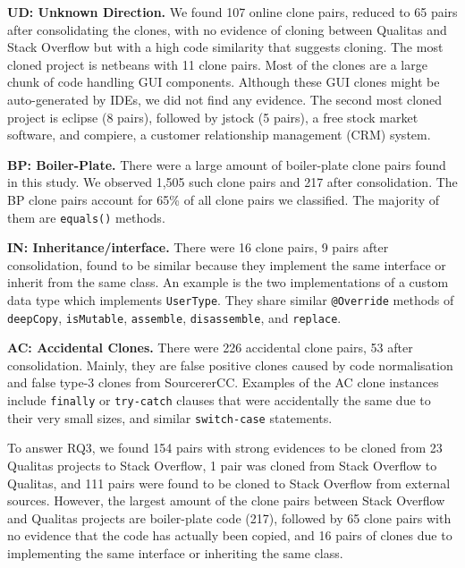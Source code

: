 \documentclass[10pt,journal,compsoc]{IEEEtran}
\newenvironment{boxquote}{\vspace{-1ex}\setlength{\FrameSep}{1\fboxsep}\begin{framed}\setlength{\parskip}{0.5\baselineskip}\setlength{\parindent}{0pt}}{\end{framed}}
\begin{document}

\textbf{UD: Unknown Direction.} We found 107 online clone pairs, reduced to 65
pairs after consolidating the clones, with no evidence of cloning between Qualitas
and Stack Overflow but with a high code similarity that suggests cloning. 
The most cloned project is \textsf{netbeans} with 11 clone pairs. Most of the
clones are a large chunk of code handling GUI components. Although these GUI
clones might be auto-generated by IDEs, we did not find any evidence. The second
most cloned project is \textsf{eclipse} (8 pairs), followed by
\textsf{jstock}  (5 pairs),
a free stock market software, and \textsf{compiere}, a customer
relationship management (CRM) system.

\textbf{BP: Boiler-Plate.} There were a large amount of boiler-plate clone pairs
found in this study. We observed 1,505 such clone pairs and 217 after
consolidation. The BP clone pairs account for 65\% of all clone pairs we
classified. The majority of them are {\small{\texttt{equals()}}} methods.

\textbf{IN: Inheritance/interface.} There were 16 clone pairs, 9 pairs after
consolidation, found to be similar because they implement the same interface or
inherit from the same class. An example is the two implementations of a
custom data type which implements {\small\texttt{UserType}}. They share similar
{\small\texttt{@Override}} methods of {\small\texttt{deepCopy}},
{\small\texttt{isMutable}}, {\small\texttt{assemble}},
{\small\texttt{disassemble}}, and {\small\texttt{replace}}.

\textbf{AC: Accidental Clones.} There were 226 accidental clone
pairs, 53 after consolidation. Mainly, they are false positive clones caused by code
normalisation and false type-3 clones from SourcererCC. 
Examples of the AC clone instances include {\small\texttt{finally}} or
{\small\texttt{try-catch}} clauses that were accidentally the same due
to their very small sizes, and similar {\small\texttt{switch-case}}
statements.

\begin{boxquote}
To answer RQ3, we found 154 pairs with
strong evidences to be cloned from 23 Qualitas projects to Stack Overflow, 1 pair
was cloned from Stack Overflow to Qualitas, and
111 pairs were found to be cloned to Stack Overflow from external
sources. However, the largest amount of the clone pairs
between Stack Overflow and Qualitas projects are \linebreak boiler-plate code
(217), followed by 65 clone pairs with no evidence that the code has actually been copied,
and 16 pairs of clones due to implementing the same interface or inheriting the same class.
\end{boxquote}
\end{document}
